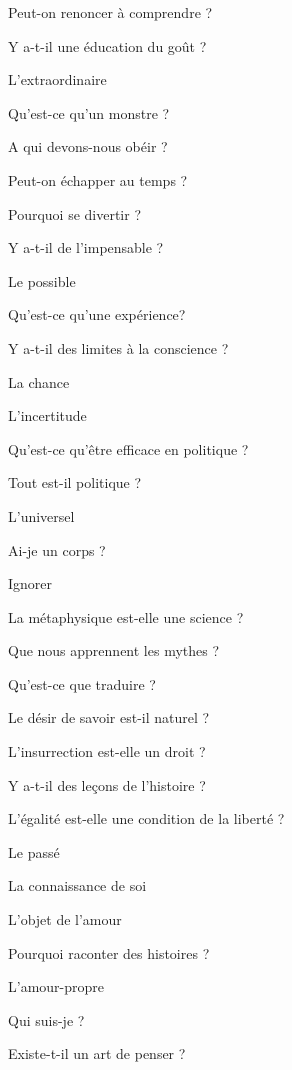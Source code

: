 \documentclass[a4paper,12pt]{report}
\begin{document}
\begin{multicols}{2}
\noindent Peut-on renoncer à comprendre ? \par
\noindent Y a-t-il une éducation du goût ? \par
\noindent L'extraordinaire \par
\noindent Qu'est-ce qu'un monstre ? \par
\noindent A qui devons-nous obéir ? \par
\noindent Peut-on échapper au temps ? \par
\noindent Pourquoi se divertir ? \par
\noindent Y a-t-il de l'impensable ? \par
\noindent Le possible \par
\noindent Qu'est-ce qu'une expérience? \par
\noindent Y a-t-il des limites à la conscience ? \par
\noindent La chance \par
\noindent L'incertitude \par
\noindent Qu'est-ce qu'être efficace en politique ? \par
\noindent Tout est-il politique ? \par
\noindent L'universel \par
\noindent Ai-je un corps ? \par
\noindent Ignorer \par
\noindent La métaphysique est-elle une science ? \par
\noindent Que nous apprennent les mythes ? \par
\noindent Qu'est-ce que traduire ? \par
\noindent Le désir de savoir est-il naturel ? \par
\noindent L'insurrection est-elle un droit ? \par
\noindent Y a-t-il des leçons de l'histoire ? \par
\noindent L'égalité est-elle une condition de la liberté ? \par
\noindent Le passé \par
\noindent La connaissance de soi \par
\noindent L'objet de l'amour \par
\noindent Pourquoi raconter des histoires ? \par
\noindent L'amour-propre \par
\noindent Qui suis-je ? \par
\noindent Existe-t-il un art de penser ? \par

\end{multicols}
\end{document}
